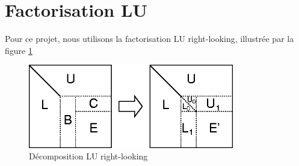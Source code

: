 \section{Factorisation LU} %
\label{sec:factorisation_lu}

Pour ce projet, nous utilisons la factorisation LU right-looking, illustrée par la figure \ref{fig:lu}
\begin{figure}[H]
\centering
\includegraphics[width=0.8\textwidth]{lu.png}
\caption{Décomposition LU right-looking}
\label{fig:lu}
\end{figure}

